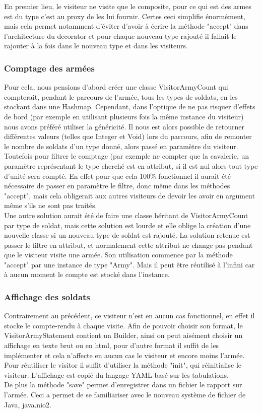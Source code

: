 \documentclass[12pt]{article}
\begin{document}
En premier lieu, le visiteur ne visite que le composite, pour ce qui est des armes
est du type c'est au proxy de les lui fournir. Certes ceci simplifie énormément,
mais cela permet notamment d'éviter d'avoir à écrire la méthode "accept" dans
l'architecture du decorator et pour chaque nouveau type rajouté il fallait le rajouter
à la fois dans le nouveau type et dans les visiteurs.

\subsubsection{Comptage des armées}
Pour cela, nous pensions d'abord créer une classe VisitorArmyCount qui compterait, 
pendant le parcours de l'armée, tous les types de soldats, en les stockant dans 
une Hashmap. Cependant, dans l'optique de ne pas risquer d'effets de bord (par 
exemple en utilisant plusieurs fois la même instance du visiteur) nous avons 
préféré utiliser la généricité. Il nous est alors possible de retourner 
différentes valeurs (telles que Integer et Void) lors du parcours, afin de 
remonter le nombre de soldats d'un type donné, alors passé en paramètre du 
visiteur. Toutefois pour filtrer le comptage (par exemple ne compter que la 
cavalerie, un paramètre représentant le type cherché est en attribut, si il est 
nul alors tout type d'unité sera compté. En effet pour que cela 100\% 
fonctionnel il aurait été nécessaire de passer en paramètre le filtre, donc même
dans les méthodes "accept", mais cela obligerait aux autres visiteurs de devoir les avoir
en argument même s'ils ne sont pas traités.\\
Une autre solution aurait été de faire une classe héritant de VisitorArmyCount par
type de soldat, mais cette solution est lourde et elle oblige la création d'une nouvelle
classe si un nouveau type de soldat est rajouté.
La solution retenue est passer le filtre en attribut, et normalement cette attribut ne 
change pas pendant que le visiteur visite une armée. 
Son utilisation commence par la méthode "accept" par une instance de type "Army".
Mais il peut être réutilisé à l'infini car à aucun moment le compte est stocké dans
l'instance.

\subsubsection{Affichage des soldats}
Contrairement au précédent, ce visiteur n'est en aucun cas fonctionnel,
en effet il stocke le compte-rendu à chaque visite.
Afin de pouvoir choisir son format, le VisitorArmyStatement contient un Builder,
ainsi on peut aisément choisir un affichage en texte brut ou en html, pour d'autre
format il suffit de les implémenter et cela n'affecte en aucun cas le visiteur et encore 
moins l'armée. Pour réutiliser le visitor il suffit d'utiliser la méthode "init",
qui réinitialise le visiteur. L'affichage est copié du langage YAML basé sur les 
tabulations. \\
De plus la méthode "save" permet d'enregistrer dans un fichier le rapport sur l'armée.
Ceci a permet de se familiariser avec le nouveau système de fichier de Java, java.nio2.
\end{document}
